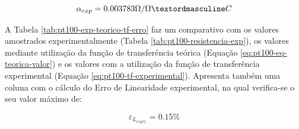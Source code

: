 \documentclass[a4paper]{instrumentacao}
\begin{document}
\begin{equation}
	\alpha_{exp}=0.003783\Omega/\OmegaºC
	\label{eq:pt100-alpha-experimental}
\end{equation}

A Tabela \ref{tab:pt100-exp-teorico-tf-erro} faz um comparativo com os valores amostrados experimentalmente (Tabela \ref{tab:pt100-resistencia-exp}), os valores mediante utilização da função de transferência teórica (Equação \ref{eq:pt100-eq-teorica-valor}) e os valores com a utilização da função de transferência experimental (Equação \ref{eq:pt100-tf-experimental}). Apresenta também uma coluna com o cálculo do Erro de Linearidade experimental, na qual verifica-se o seu valor máximo de:

\begin{equation}
	\varepsilon_{L_{exp\%}}=0.15\%
	\label{eq:pt100-erro-linearidade-experimental}
\end{equation}
\end{document}
